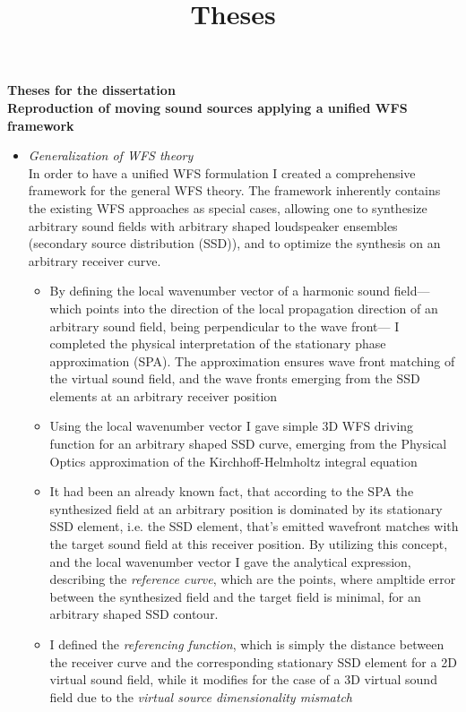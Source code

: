 \documentclass[a4paper,10pt]{article}
\title{Theses}
\date{}
\begin{document}
\begin{center}
  \textbf{\normalsize Theses for the dissertation \\
   		  \Large Reproduction of moving sound sources applying a unified WFS framework}\\[0.5cm]
\end{center}

\begin{itemize}
\item \emph{Generalization of WFS theory} \\ 
In order to have a unified WFS formulation I created a comprehensive framework for the general WFS theory. The framework inherently contains the existing WFS approaches as special cases, allowing one to synthesize arbitrary sound fields with arbitrary shaped loudspeaker ensembles (secondary source distribution (SSD)), and to optimize the synthesis on an arbitrary receiver curve. 
\begin{itemize}
\item By defining the local wavenumber vector of a harmonic sound field---which points into the direction of the local propagation direction of an arbitrary sound field, being perpendicular to the wave front--- I completed the physical interpretation of the stationary phase approximation (SPA). The approximation ensures wave front matching of the virtual sound field, and the wave fronts emerging from the SSD elements at an arbitrary receiver position
\item Using the local wavenumber vector I gave simple 3D WFS driving function for an arbitrary shaped SSD curve, emerging from the Physical Optics approximation of the Kirchhoff-Helmholtz integral equation
\item It had been an already known fact, that according to the SPA the synthesized field at an arbitrary position is dominated by its stationary SSD element, i.e. the SSD element, that's emitted wavefront matches with the target sound field at this receiver position.
By utilizing this concept, and the local wavenumber vector I gave the analytical expression, describing the \emph{reference curve}, which are the points, where ampltide error between the synthesized field and the target field is minimal, for an arbitrary shaped SSD contour.
\item I defined the \emph{referencing function}, which is simply the distance between the receiver curve and the corresponding stationary SSD element for a 2D virtual sound field, while it modifies for the case of a 3D virtual sound field due to the \emph{virtual source dimensionality mismatch}

\end{itemize}
\end{itemize}
\end{document}
